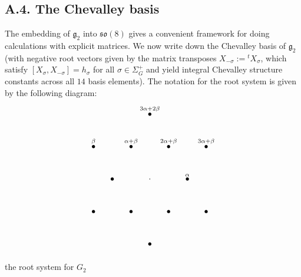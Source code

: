 \documentclass[12pt,letterpaper]{amsart}
\theoremstyle{plain}
\theoremstyle{definition}
\theoremstyle{remark}
\theoremstyle{definition}
\begin{document}
\subsection*{A.4. The Chevalley basis}

The embedding of ${\mathfrak g}_2$ into $\mathfrak{so}(8)$ gives a convenient framework
for doing calculations with explicit matrices. We now write down
the Chevalley basis of ${\mathfrak g}_2$ (with negative root vectors given by
the matrix transposes $X_{-\sigma}:={}^t X_\sigma$, which satisfy
$[X_\sigma,X_{-\sigma}]=h_\sigma$ for all $\sigma\in\Sigma_G^+$ and yield
integral Chevalley structure constants across all $14$ basis elements). The
notation for the root system is given
by the following diagram:
\[
\begin{tikzpicture}[x=1.6cm,y=1.6cm]
\foreach \p/\l in {{(0,1.732)}/{3\alpha+2\beta}, {(-1.5,0.866)}/{\beta},
  {(-0.5,0.866)}/{\alpha+\beta}, {(0.5,0.866)}/{2\alpha+\beta},
  {(1.5,0.866)}/{3\alpha+\beta}, {(1,0)}/{\alpha}}
  {\node at \p {$\bullet$}; \node[above] at \p {$\scriptstyle \l$};}
\foreach \p in {(-1,0),(-1.5,-0.866),(-0.5,-0.866),(0.5,-0.866),(1.5,-0.866),(0,-1.732)}
  {\node at \p {$\bullet$};}
\node at (0,0) {$\cdot$};
\end{tikzpicture}
\]
\centerline{the root system for $G_2$}
\end{document}
